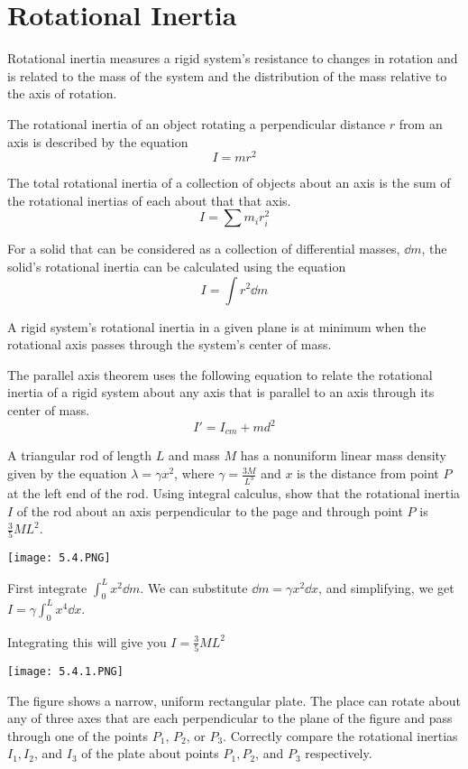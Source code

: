\documentclass[../mech.tex]{subfiles}
\begin{document}
\section{Rotational Inertia}
Rotational inertia measures a rigid system's resistance to changes in rotation and is related to the mass of the system and the distribution of the mass relative to the axis of rotation.

The rotational inertia of an object rotating a perpendicular distance $r$ from an axis is described by the equation 
\[ I=mr^2 \]

The total rotational inertia of a collection of objects about an axis is the sum of the rotational inertias of each about that that axis.
\[ I= \sum m_ir_i^2 \]

For a solid that can be considered as a collection of differential masses, $\dd m$, the solid's rotational inertia can be calculated using the equation 
\[ I = \int r^2 \dd m\] 

A rigid system's rotational inertia in a given plane is at minimum when the rotational axis passes through the system's center of mass.

The parallel axis theorem uses the following equation to relate the rotational inertia of a rigid system about any axis that is parallel to an axis through its center of mass.
\[ I'=I_{cm}+md^2 \]

\begin{example}
    A triangular rod of length $L$ and mass $M$ has a nonuniform linear mass density given by the equation $\lambda = \gamma x^2$, where $\gamma = \frac{3M}{L^3}$ and $x$ is the distance from point $P$ at the left end of the rod.
    Using integral calculus, show that the rotational inertia $I$ of the rod about an axis perpendicular to the page and through point $P$ is $\frac{3}{5}ML^2$.
    \begin{center}
        \texttt{[image: 5.4.PNG]}
    \end{center}

    First integrate $\int_0^{L}x^2 \dd m$. We can substitute $\dd m = \gamma x^2 \dd x$, and simplifying, we get $I=\gamma \int_0^{L}x^4 \dd x$.

    Integrating this will give you $I=\frac{3}{5}ML^2$
\end{example}

\ex \begin{center}
    \texttt{[image: 5.4.1.PNG]}
\end{center}
The figure shows a narrow, uniform rectangular plate. The place can rotate about any of three axes that are each perpendicular to the plane of the figure and pass through one of the points 
$P_1$, $P_2$, or $P_3$. Correctly compare the rotational inertias $I_1, I_2$, and $I_3$ of the plate about points $P_1, P_2$, and $P_3$ respectively.
\end{document}
